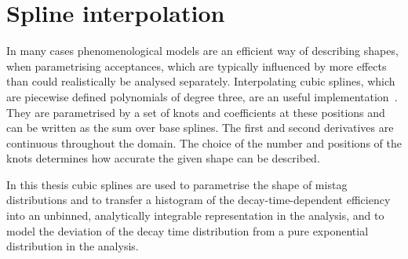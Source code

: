 
\section{Spline interpolation}
\label{sec:dataanalysis:splines}

In many cases phenomenological models are an efficient way of describing
shapes, \eg when parametrising acceptances, which are typically influenced by
more effects than could realistically be analysed separately. Interpolating
cubic splines, which are piecewise defined polynomials of degree three, are an
useful implementation~\cite{Splines}. They are parametrised by a set of knots
and coefficients at these positions and can be written as the sum over base
splines. The first and second derivatives are continuous throughout the
domain. The choice of the number and positions of the knots determines how
accurate the given shape can be described.

In this thesis cubic splines are used to parametrise the shape of mistag
distributions and to transfer a histogram of the decay-time-dependent
efficiency into an unbinned, analytically integrable representation in the
\BdToJPsiKS analysis, and to model the deviation of the decay time
distribution from a pure exponential distribution in the \BdToDD analysis.
